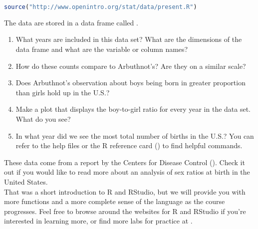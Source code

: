\documentclass[11pt]{article}
\begin{document}
\begin{lstlisting}[language=R]
source("http://www.openintro.org/stat/data/present.R")
\end{lstlisting}

The data are stored in a data frame called .

\begin{enumerate}
\item What years are included in this data set? What are the dimensions of the data frame and what are the variable or column names?
\item How do these counts compare to Arbuthnot's? Are they on a similar scale?
\item Does Arbuthnot's observation about boys being born in greater proportion than girls hold up in the U.S.?
\item Make a plot that displays the boy-to-girl ratio for every year in the data set. What do you see?
\item In what year did we see the most total number of births in the U.S.? You can refer to the help files or the R reference card () to find helpful commands. \\
\end{enumerate}

These data come from a report by the Centers for Disease Control (). Check it out if you would like to read more about an analysis of sex ratios at birth in the United States. \\

That was a short introduction to R and RStudio, but we will provide you with more functions and a more complete sense of the language as the course progresses. Feel free to browse around the websites for R  and RStudio  if you're interested in learning more, or find more labs for practice at .

\vfill


\theendnotes
\end{document}
